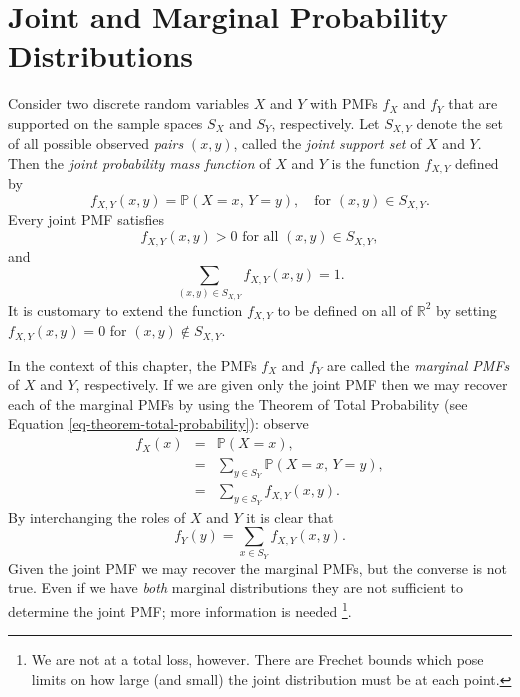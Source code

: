 \documentclass[captions=tableheading]{scrbook}
\begin{document}
\section{Joint and Marginal Probability Distributions}
\label{sec-7-1}
\label{sec-Joint-Probability-Distributions}


Consider two discrete random variables \(X\) and \(Y\) with PMFs \(f_{X}\) and \(f_{Y}\) that are supported on the sample spaces \(S_{X}\) and \(S_{Y}\), respectively. Let \(S_{X,Y}\) denote the set of all possible observed \emph{pairs} \((x,y)\), called the \emph{joint support set} of \(X\) and \(Y\). Then the \emph{joint probability mass function} of \(X\) and \(Y\) is the function \(f_{X,Y}\) defined by
\begin{equation}
f_{X,Y}(x,y)=\mathbb{P}(X=x,\, Y=y),\quad \mbox{for }(x,y)\in S_{X,Y}.\label{eq-joint-pmf}
\end{equation}
Every joint PMF satisfies
\begin{equation}
f_{X,Y}(x,y)>0\mbox{ for all }(x,y)\in S_{X,Y},
\end{equation}
and
\begin{equation}
\sum_{(x,y)\in S_{X,Y}}f_{X,Y}(x,y)=1.
\end{equation}
It is customary to extend the function \(f_{X,Y}\) to be defined on all of \(\mathbb{R}^{2}\) by setting \(f_{X,Y}(x,y)=0\) for \((x,y)\not\in S_{X,Y}\). 

In the context of this chapter, the PMFs \(f_{X}\) and \(f_{Y}\) are called the \emph{marginal PMFs} of \(X\) and \(Y\), respectively. If we are given only the joint PMF then we may recover each of the marginal PMFs by using the Theorem of Total Probability (see Equation \ref{eq-theorem-total-probability}): observe
\begin{eqnarray}
f_{X}(x) & = & \mathbb{P}(X=x),\\
 & = & \sum_{y\in S_{Y}}\mathbb{P}(X=x,\, Y=y),\\
 & = & \sum_{y\in S_{Y}}f_{X,Y}(x,y).
\end{eqnarray}
By interchanging the roles of \(X\) and \(Y\) it is clear that 
\begin{equation}
f_{Y}(y)=\sum_{x\in S_{Y}}f_{X,Y}(x,y).\label{eq-marginal-pmf}
\end{equation}
Given the joint PMF we may recover the marginal PMFs, but the converse is not true. Even if we have \emph{both} marginal distributions they are not sufficient to determine the joint PMF; more information is needed
\footnote{We are not at a total loss, however. There are Frechet bounds which pose limits on how large (and small) the joint distribution must be at each point.}.
\end{document}
